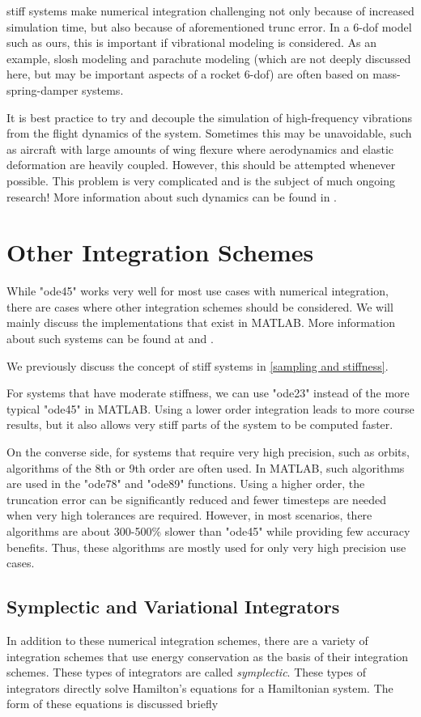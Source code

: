 \documentclass[12pt]{report}
\begin{document}
\Gls{stiff} systems make numerical integration challenging not only because of increased simulation time, but also because of aforementioned \gls{trunc error}. In a 6-\gls{dof} model such as ours, this is important if vibrational modeling is considered. As an example, slosh modeling and parachute modeling (which are not deeply discussed here, but may be important aspects of a rocket 6-\gls{dof}) are often based on mass-spring-damper systems.

It is best practice to try and decouple the simulation of high-frequency vibrations from the flight dynamics of the system. Sometimes this may be unavoidable, such as aircraft with large amounts of wing flexure where aerodynamics and elastic deformation are heavily coupled. However, this should be attempted whenever possible. This problem is very complicated and is the subject of much ongoing research! More information about such dynamics can be found in \cite{shyy_recent_2010}.
\section{Other Integration Schemes}
While "ode45" works very well for most use cases with numerical integration, there are cases where other integration schemes should be considered. We will mainly discuss the implementations that exist in MATLAB. More information about such systems can be found at \cite{mathworks_choose_2024} and \cite{mathworks_summary_2024}.

We previously discuss the concept of \gls{stiff} systems in \ref{sampling and stiffness}. 

For systems that have moderate stiffness, we can use "ode23" instead of the more typical "ode45" in MATLAB. Using a lower order integration leads to more course results, but it also allows very stiff parts of the system to be computed faster.

On the converse side, for systems that require very high precision, such as orbits, algorithms of the 8th or 9th order are often used. In MATLAB, such algorithms are used in the "ode78" and "ode89" functions. Using a higher order, the truncation error can be significantly reduced and fewer timesteps are needed when very high tolerances are required. However, in most scenarios, there algorithms are about 300-500\% slower than "ode45" while providing few accuracy benefits. Thus, these algorithms are mostly used for only very high precision use cases.

\subsection{Symplectic and Variational Integrators}
In addition to these numerical integration schemes, there are a variety of integration schemes that use energy conservation as the basis of their integration schemes. These types of integrators are called \textit{symplectic}. These types of integrators directly solve Hamilton's equations for a Hamiltonian system. The form of these equations is discussed briefly 
\end{document}
